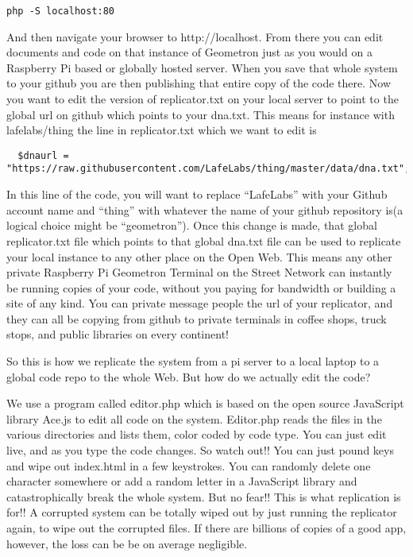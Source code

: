 \begin{verbatim}
php -S localhost:80
\end{verbatim}

And then navigate your browser to http://localhost.  From there you can edit documents and code on that instance of Geometron just as you would on a Raspberry Pi based or globally hosted server.   When you save that whole system to your github you are then publishing that entire copy of the code there.  Now you want to edit the version of replicator.txt on your local server to point to the global url on github which points to your dna.txt.  This means for instance with lafelabs/thing the line in replicator.txt which we want to edit is 

\begin{verbatim}
  $dnaurl = "https://raw.githubusercontent.com/LafeLabs/thing/master/data/dna.txt";
\end{verbatim}

In this line of the code, you will want to replace ``LafeLabs'' with your Github account name and ``thing'' with whatever the name of your github repository is(a logical choice might be ``geometron'').  Once this change is made, that global replicator.txt file which points to that global dna.txt file can be used to replicate your local instance to any other place on the Open Web.  This means any other private Raspberry Pi Geometron Terminal on the Street Network can instantly be running copies of your code, without you paying for bandwidth or building a site of any kind.  You can private message people the url of your replicator, and they can all be copying from github to private terminals in coffee shops, truck stops, and public libraries on every continent!

So this is how we replicate the system from a pi server to a local laptop to a global code repo to the whole Web.  But how do we actually edit the code?  

We use a program called editor.php which is based on the open source JavaScript library Ace.js to edit all code on the system.  Editor.php reads the files in the various directories and lists them, color coded by code type.  You can just edit live, and as you type the code changes. So watch out!! You can just pound keys and wipe out index.html in a few keystrokes. You can randomly delete one character somewhere or add a random letter in a JavaScript library and catastrophically break the whole system. But no fear!! This is what replication is for!! A corrupted system can be totally wiped out by just running the replicator again, to wipe out the corrupted files.  If there are billions of copies of a good app, however, the loss can be be on average negligible.  

